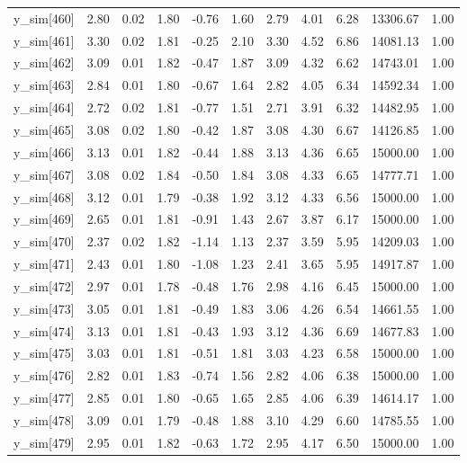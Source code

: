 \begin{table}[ht]
\begin{tabular}{rrrrrrrrrrr}
  y\_sim[460] & 2.80 & 0.02 & 1.80 & -0.76 & 1.60 & 2.79 & 4.01 & 6.28 & 13306.67 & 1.00 \\ 
  y\_sim[461] & 3.30 & 0.02 & 1.81 & -0.25 & 2.10 & 3.30 & 4.52 & 6.86 & 14081.13 & 1.00 \\ 
  y\_sim[462] & 3.09 & 0.01 & 1.82 & -0.47 & 1.87 & 3.09 & 4.32 & 6.62 & 14743.01 & 1.00 \\ 
  y\_sim[463] & 2.84 & 0.01 & 1.80 & -0.67 & 1.64 & 2.82 & 4.05 & 6.34 & 14592.34 & 1.00 \\ 
  y\_sim[464] & 2.72 & 0.02 & 1.81 & -0.77 & 1.51 & 2.71 & 3.91 & 6.32 & 14482.95 & 1.00 \\ 
  y\_sim[465] & 3.08 & 0.02 & 1.80 & -0.42 & 1.87 & 3.08 & 4.30 & 6.67 & 14126.85 & 1.00 \\ 
  y\_sim[466] & 3.13 & 0.01 & 1.82 & -0.44 & 1.88 & 3.13 & 4.36 & 6.65 & 15000.00 & 1.00 \\ 
  y\_sim[467] & 3.08 & 0.02 & 1.84 & -0.50 & 1.84 & 3.08 & 4.33 & 6.65 & 14777.71 & 1.00 \\ 
  y\_sim[468] & 3.12 & 0.01 & 1.79 & -0.38 & 1.92 & 3.12 & 4.33 & 6.56 & 15000.00 & 1.00 \\ 
  y\_sim[469] & 2.65 & 0.01 & 1.81 & -0.91 & 1.43 & 2.67 & 3.87 & 6.17 & 15000.00 & 1.00 \\ 
  y\_sim[470] & 2.37 & 0.02 & 1.82 & -1.14 & 1.13 & 2.37 & 3.59 & 5.95 & 14209.03 & 1.00 \\ 
  y\_sim[471] & 2.43 & 0.01 & 1.80 & -1.08 & 1.23 & 2.41 & 3.65 & 5.95 & 14917.87 & 1.00 \\ 
  y\_sim[472] & 2.97 & 0.01 & 1.78 & -0.48 & 1.76 & 2.98 & 4.16 & 6.45 & 15000.00 & 1.00 \\ 
  y\_sim[473] & 3.05 & 0.01 & 1.81 & -0.49 & 1.83 & 3.06 & 4.26 & 6.54 & 14661.55 & 1.00 \\ 
  y\_sim[474] & 3.13 & 0.01 & 1.81 & -0.43 & 1.93 & 3.12 & 4.36 & 6.69 & 14677.83 & 1.00 \\ 
  y\_sim[475] & 3.03 & 0.01 & 1.81 & -0.51 & 1.81 & 3.03 & 4.23 & 6.58 & 15000.00 & 1.00 \\ 
  y\_sim[476] & 2.82 & 0.01 & 1.83 & -0.74 & 1.56 & 2.82 & 4.06 & 6.38 & 15000.00 & 1.00 \\ 
  y\_sim[477] & 2.85 & 0.01 & 1.80 & -0.65 & 1.65 & 2.85 & 4.06 & 6.39 & 14614.17 & 1.00 \\ 
  y\_sim[478] & 3.09 & 0.01 & 1.79 & -0.48 & 1.88 & 3.10 & 4.29 & 6.60 & 14785.55 & 1.00 \\ 
  y\_sim[479] & 2.95 & 0.01 & 1.82 & -0.63 & 1.72 & 2.95 & 4.17 & 6.50 & 15000.00 & 1.00 \\ 

\end{tabular}
\end{table}
